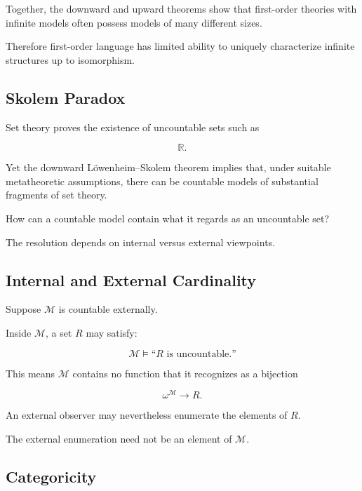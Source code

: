 Together, the downward and upward theorems show that first-order theories
with infinite models often possess models of many different sizes.

Therefore first-order language has limited ability to uniquely characterize
infinite structures up to isomorphism.

\subsection{Skolem Paradox}
\label{subsec:skolem-paradox}

Set theory proves the existence of uncountable sets such as

\[
\mathbb{R}.
\]

Yet the downward Löwenheim--Skolem theorem implies that, under suitable
metatheoretic assumptions, there can be countable models of substantial
fragments of set theory.

How can a countable model contain what it regards as an uncountable set?

The resolution depends on internal versus external viewpoints.

\subsection{Internal and External Cardinality}
\label{subsec:internal-external-cardinality}

Suppose \(\mathcal{M}\) is countable externally.

Inside \(\mathcal{M}\), a set \(R\) may satisfy:

\[
\boxed{
\mathcal{M}
\models
\text{``\(R\) is uncountable.''}
}
\]

This means \(\mathcal{M}\) contains no function that it recognizes as a
bijection

\[
\omega^\mathcal{M}
\to
R.
\]

An external observer may nevertheless enumerate the elements of \(R\).

The external enumeration need not be an element of \(\mathcal{M}\).

\subsection{Categoricity}
\label{subsec:model-theoretic-categoricity}

